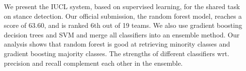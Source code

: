 We present the IUCL system, based on supervised learning, for the shared task on stance detection. Our official submission, the random forest model, reaches a score of 63.60, and is ranked 6th out of 19 teams. We  also use gradient boosting decision trees and SVM and merge all classifiers into an  ensemble method. Our analysis shows that random forest is good at retrieving minority classes and gradient boosting majority classes.  The strengths of different classifiers wrt. precision and recall complement each other in the ensemble.
